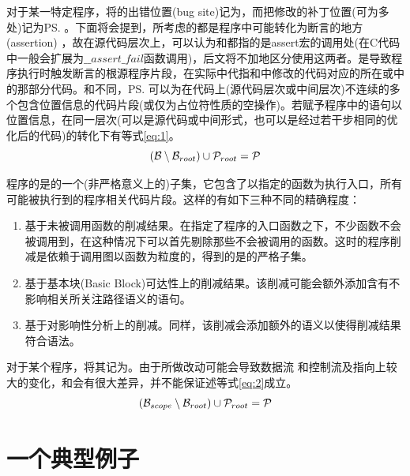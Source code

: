 对于某一特定程序，将\prog 的出错位置(bug site)记为\prog\bs ，而把修改的补丁位置(可为多处)记为\prog\ps 。下面将会提到，\dryrun 所考虑的\prog\bs 都是程序中可能转化为断言的地方(assertion) \prog\ass ，故在源代码层次上，可以认为\prog\ass 和\prog\bs 都指的是assert宏的调用处(在C代码中一般会扩展为$\_\_assert\_fail$函数调用)，后文将不加地区分使用这两者。\prog\bs 是导致程序执行时触发断言的根源程序片段，在实际中代指\bug 和\patch 中修改的代码对应的所在\bug 或\patch 中的那部分代码。和\prog\bs 不同，\prog\ps 可以为在代码上(源代码层次或中间层次)不连续的多个包含位置信息的代码片段(或仅为占位符性质的空操作)。若赋予程序中的语句以位置信息，在同一层次(可以是源代码或中间形式，也可以是经过若干步相同的优化后的代码)的转化下有等式\ref{eq:1}。
\begin{equation}
  \label{eq:1}
  (\mathcal{B} \setminus \mathcal{B}_{root} )\cup \mathcal{P}_{root} = \mathcal{P}
\end{equation}

程序的\rbscope 是\prog 的一个(非严格意义上的)子集，它包含了以指定的函数为执行入口，所有可能被执行到的程序相关代码片段。这样的\rbscope 有如下三种不同的精确程度：
\begin{enumerate}
\item 基于未被调用函数的削减结果。在指定了程序的入口函数之下，不少函数不会被调用到，在这种情况下可以首先剔除那些不会被调用的函数。这时的程序削减是依赖于调用图以函数为粒度的，得到的\rbscope 是\prog 的严格子集。
\item 基于基本块(Basic Block)可达性上的削减结果。该削减可能会额外添加含有不影响相关所关注路径语义的语句。
\item 基于对\prog\bs 影响性分析上的削减。同样，该削减会添加额外的语义以使得削减结果符合语法。
\end{enumerate}

对于某个程序\prog ，将其\rbscope 记为\prog\scope 。由于所做改动可能会导致数据流
和控制流及指向上较大的变化，\bug\scope 和\patch\scope 会有很大差异，并不能保证述等式\ref{eq:2}成立。
\begin{equation}
\label{eq:2}
(\mathcal{B}_{scope} \setminus \mathcal{B}_{root} )\cup \mathcal{P}_{root} = \mathcal{P}
\end{equation}

\section{一个典型例子}
\label{sec:gimp_example}


